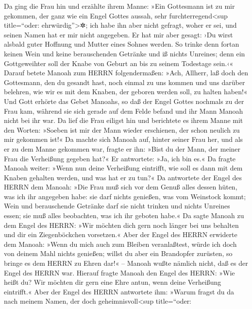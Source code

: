 Da ging die Frau hin und erzählte ihrem Manne: »Ein
Gottesmann ist zu mir gekommen, der ganz wie ein Engel Gottes aussah,
sehr furchterregend\textless sup title=``oder: ehrwürdig''\textgreater✲;
ich habe ihn aber nicht gefragt, woher er sei, und seinen Namen hat er
mir nicht angegeben. Er hat mir aber gesagt: ›Du wirst
alsbald guter Hoffnung und Mutter eines Sohnes werden. So trinke denn
fortan keinen Wein und keine berauschenden Getränke und iß nichts
Unreines; denn ein Gottgeweihter soll der Knabe von Geburt an bis zu
seinem Todestage sein.‹« Darauf betete Manoah zum HERRN
folgendermaßen: »Ach, Allherr, laß doch den Gottesmann, den du gesandt
hast, noch einmal zu uns kommen und uns darüber belehren, wie wir es mit
dem Knaben, der geboren werden soll, zu halten haben!« Und
Gott erhörte das Gebet Manoahs, so daß der Engel Gottes nochmals zu der
Frau kam, während sie sich gerade auf dem Felde befand und ihr Mann
Manoah nicht bei ihr war. Da lief die Frau eiligst hin
und berichtete es ihrem Manne mit den Worten: »Soeben ist mir der Mann
wieder erschienen, der schon neulich zu mir gekommen ist!«
Da machte sich Manoah auf, hinter seiner Frau her, und
als er zu dem Manne gekommen war, fragte er ihn: »Bist du der Mann, der
meiner Frau die Verheißung gegeben hat?« Er antwortete:
»Ja, ich bin es.« Da fragte Manoah weiter: »Wenn nun deine Verheißung
eintrifft, wie soll es dann mit dem Knaben gehalten werden, und was hat
er zu tun?« Da antwortete der Engel des HERRN dem Manoah:
»Die Frau muß sich vor dem Genuß alles dessen hüten, was ich ihr
angegeben habe: sie darf nichts genießen, was vom
Weinstock kommt; Wein und berauschende Getränke darf sie nicht trinken
und nichts Unreines essen; sie muß alles beobachten, was ich ihr geboten
habe.« Da sagte Manoah zu dem Engel des HERRN: »Wir
möchten dich gern noch länger bei uns behalten und dir ein
Ziegenböckchen vorsetzen.« Aber der Engel des HERRN
erwiderte dem Manoah: »Wenn du mich auch zum Bleiben veranlaßtest, würde
ich doch von deinem Mahl nichts genießen; willst du aber ein Brandopfer
zurüsten, so bringe es dem HERRN zu Ehren dar!« -- Manoah wußte nämlich
nicht, daß es der Engel des HERRN war. Hierauf fragte
Manoah den Engel des HERRN: »Wie heißt du? Wir möchten dir gern eine
Ehre antun, wenn deine Verheißung eintrifft.« Aber der
Engel des HERRN antwortete ihm: »Warum fragst du da nach meinem Namen,
der doch geheimnisvoll\textless sup title=``oder:
